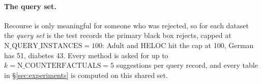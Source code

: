 \paragraph{The query set.} Recourse is only meaningful for someone who was
rejected, so for each dataset the \emph{query set} is the test records the primary
black box rejects, capped at $\text{N\_QUERY\_INSTANCES}=100$: Adult and HELOC
hit the cap at 100, German has 51, diabetes 43. Every method is asked for up to
$k=\text{N\_COUNTERFACTUALS}=5$ suggestions per query record, and every table in
\S\ref{sec:experiments} is computed on this shared set.


